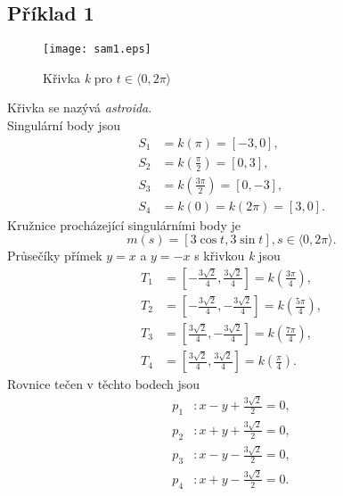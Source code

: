 \subsection*{Příklad 1}
\begin{figure}[H]
	\centering
	\texttt{[image: sam1.eps]}
	\caption{Křivka \textit{k} pro $t \in \langle0, 2\pi\rangle$}
\end{figure} 
Křivka se nazývá \textit{astroida}. \\
Singulární body jsou
\begin{align*}
	S_1 & = k\left(\pi\right) = [-3, 0],                   \\
	S_2 & = k\left(\frac{\pi}{2}\right) = [0, 3],          \\
	S_3 & = k\left(\frac{3\pi}{2}\right) = [0, -3],        \\
	S_4 & = k\left(0\right) = k\left(2\pi\right) = [3, 0]. 
\end{align*}
Kružnice procházející singulárními body je
$$m(s) = [3\cos{t}, 3\sin{t}], s \in \langle0, 2\pi\rangle.$$
Průsečíky přímek $y=x$ a $y=-x$ s křivkou \textit{k} jsou
\begin{align*}
	T_1 & = \left[-\frac{3\sqrt{2}}{4}, \frac{3\sqrt{2}}{4}\right] = k\left(\frac{3\pi}{4}\right),  \\
	T_2 & = \left[-\frac{3\sqrt{2}}{4}, -\frac{3\sqrt{2}}{4}\right] = k\left(\frac{5\pi}{4}\right), \\
	T_3 & = \left[\frac{3\sqrt{2}}{4}, -\frac{3\sqrt{2}}{4}\right] = k\left(\frac{7\pi}{4}\right),  \\
	T_4 & = \left[\frac{3\sqrt{2}}{4}, \frac{3\sqrt{2}}{4}\right] = k\left(\frac{\pi}{4}\right).    
\end{align*}
Rovnice tečen v těchto bodech jsou
\begin{align*}
	p_1 & : x - y + \frac{3\sqrt{2}}{2} = 0, \\
	p_2 & : x + y + \frac{3\sqrt{2}}{2} = 0, \\
	p_3 & : x - y - \frac{3\sqrt{2}}{2} = 0, \\
	p_4 & : x + y - \frac{3\sqrt{2}}{2} = 0. 
\end{align*} 
\clearpage	  
